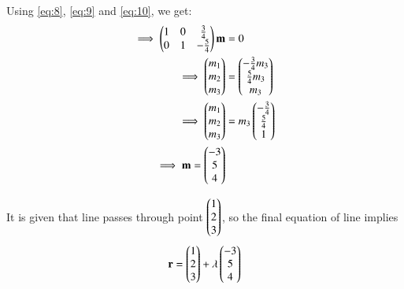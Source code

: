 \documentclass[journal,12pt,twocolumn]{IEEEtran}
\renewcommand{\vec}[1]{\boldsymbol{\mathbf{#1}}}
\begin{document}
Using \eqref{eq:8}, \eqref{eq:9} and \eqref{eq:10}, we get:
\begin{align}
    \implies \myvec{1&0&\frac{3}{4} \\ 0&1&-\frac{5}{4}}\vec{m} &= 0 \\
    \implies \myvec{{m}_1\\{m}_2\\{m}_3} &= \myvec{-\frac{3}{4}{m}_3\\\frac{5}{4}{m}_3\\{m}_3} \\
    \implies \myvec{{m}_1\\{m}_2\\{m}_3} &= {m}_3\myvec{-\frac{3}{4}\\\frac{5}{4}\\1} \\
    \implies \vec{m} = \myvec{-3\\5\\4}
\end{align}

It is given that line passes through point $\begin{pmatrix}1\\2\\3\end{pmatrix}$, so the final equation of line implies
\begin{align}
    \vec{r} = \myvec{1\\2\\3} + \lambda\myvec{-3\\5\\4} \\
\end{align}
\end{document}

